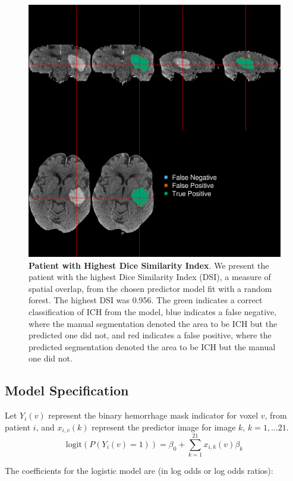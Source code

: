\documentclass{elsarticle_nonatbib}\usepackage[]{graphicx}\usepackage[]{color}
\begin{document}
 \begin{figure}
\centering
\includegraphics[width=0.75\linewidth,keepaspectratio]{Reseg_Figure_DSI_Quantile_100_native.png}
\caption{{\bf Patient with  Highest Dice Similarity Index}. We present the patient with the highest Dice Similarity Index (DSI), a measure of spatial overlap, from the chosen predictor model fit with a random forest.  The highest DSI was 0.956. The green indicates a correct classification of ICH from the model, blue indicates a false negative, where the manual segmentation denoted the area to be ICH but the predicted one did not, and red indicates a false positive, where the predicted segmentation denoted the area to be ICH but the manual one did not. }
\label{fig:dice_img100}
\end{figure}




\subsection{Model Specification}
\label{sec:modspec}

Let $Y_{i}(v)$ represent the binary hemorrhage mask indicator for voxel $v$, from patient $i$, and $x_{i,v}(k)$ represent the predictor image for image $k$, $k = 1, \dots 21$.
$$
\text{logit}\left(P(Y_{i}(v) = 1)\right) = \beta_0 + \sum_{k = 1}^{21} x_{i, k}(v)\beta_{k}
$$

The coefficients for the logistic model are (in log odds or log odds ratios):
\end{document}
